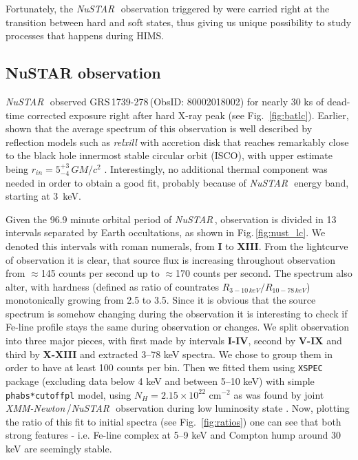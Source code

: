 \documentclass[a4paper,fleqn,usenatbib]{mnras}
\def\grs{{GRS\,1739-278\,}}
\def\xmm{{\em XMM-Newton\,}}
\def\nustar{{\em NuSTAR\,}}
\begin{document}
Fortunately, the \nustar\, \citep{harrison13_nust} observation triggered by \cite{miller15_nust} were carried right at the transition between hard and soft states, thus giving us unique possibility to study processes that happens during HIMS. 

\subsection{NuSTAR observation}
\label{sec:nust} 

\nustar\, observed \grs (ObsID: 80002018002) for nearly 30 ks of dead-time corrected exposure right after hard X-ray peak (see Fig.~\ref{fig:batlc}). Earlier, \cite{miller15_nust} shown that the average spectrum of this observation is well described by reflection models such as {\it relxill} \citep{garcia14, dauser14,dauser16} with accretion disk that reaches remarkably close to the black hole innermost stable circular orbit (ISCO), with upper estimate being $r_{in} = 5^{+3}_{-4}\, G M/c^{2}$ \citep{miller15_nust}. Interestingly, no additional thermal component was needed in order to obtain a good fit, probably because of \nustar\, energy band, starting at 3~keV. 

Given the 96.9 minute orbital period of \nustar, observation is divided in 13 intervals separated by Earth occultations, as shown in Fig.\,\ref{fig:nust_lc}. We denoted this intervals with roman numerals, from {\bf I} to {\bf XIII}. From the lightcurve of observation it is clear, that source flux is increasing throughout observation from $\approx$145 counts per second up to $\approx$170 counts per second. 
The spectrum also alter, with hardness (defined as ratio of countrates  $R_{3-10\,keV}/R_{10-78\,keV}$) monotonically growing from 2.5 to 3.5. 
Since it is obvious that the source spectrum is somehow changing during the observation it is interesting to check if Fe-line profile stays the same during observation or changes. 
We split observation into three major pieces, with first made by intervals {\bf I-IV}, second by {\bf V-IX} and third by {\bf X-XIII} and extracted 3--78 keV spectra. 
We chose to group them in order to have at least 100 counts per bin. 
Then we fitted them using \texttt{XSPEC} package \citep{arnaud96} (excluding data below 4 keV and between 5--10 keV) with simple \texttt{phabs*cutoffpl} model, using $N_{H} = 2.15\times10^{22}$ cm$^{-2}$ as was found by joint \xmm/\nustar\, observation during low luminosity state \citep{fuerst16}. 
Now, plotting the ratio of this fit to initial spectra (see Fig.~\ref{fig:ratios}) one can see that both strong features - i.e. Fe-line complex at 5--9 keV and Compton hump around 30 keV are seemingly stable. 
\end{document}

